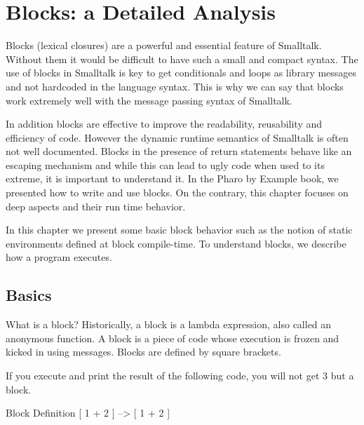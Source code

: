 \documentclass[a4paper,10pt,twoside]{book}
\begin{document}
\fi
\sloppy
\chapter{Blocks: a Detailed Analysis}


Blocks (lexical closures) are a powerful and essential feature of Smalltalk. Without them it
would be difficult to have such a small and compact syntax. The use of blocks in Smalltalk
is key to get conditionals and loops as library messages and not hardcoded in the language syntax. This is why we can say that
blocks work extremely well with the message passing syntax of Smalltalk.

In addition blocks are  effective to improve the readability, reusability and efficiency of code.
However the dynamic runtime semantics of Smalltalk is often not well documented. Blocks in the presence of return statements behave like an escaping mechanism and while this can lead to ugly code when used to its extreme, it is important to understand it. In the Pharo by Example book, we presented how to write and use blocks. On the contrary, this chapter focuses on deep aspects and their run time behavior.

In this chapter we present some basic block behavior such as the notion of static environments defined at block compile-time. To understand blocks, we describe how  a program executes.

\section{Basics}

What is a block? Historically, a block is a lambda expression, also called an anonymous function. A block is a piece of code whose execution is frozen and kicked in using messages. Blocks are defined by square brackets.

If you execute and print the result of the following code, you will not get 3 but a block.

\begin{code}{Block Definition}
[ 1 + 2 ] --> [ 1 + 2 ]
\end{code}
\end{document}
